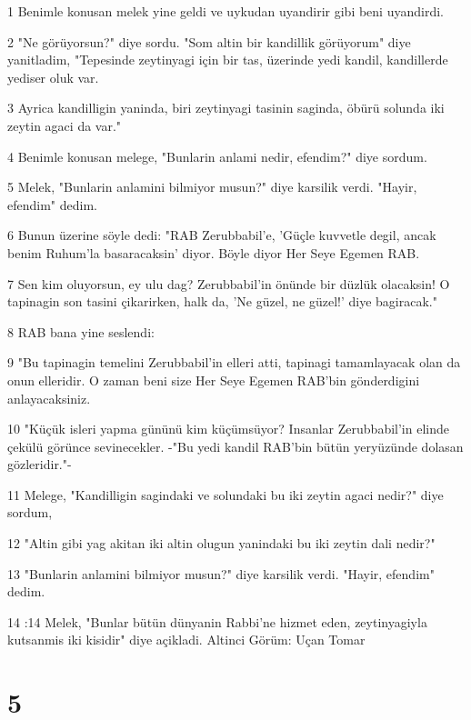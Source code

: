 \par 1 Benimle konusan melek yine geldi ve uykudan uyandirir gibi beni uyandirdi.
\par 2 "Ne görüyorsun?" diye sordu. "Som altin bir kandillik görüyorum" diye yanitladim, "Tepesinde zeytinyagi için bir tas, üzerinde yedi kandil, kandillerde yediser oluk var.
\par 3 Ayrica kandilligin yaninda, biri zeytinyagi tasinin saginda, öbürü solunda iki zeytin agaci da var."
\par 4 Benimle konusan melege, "Bunlarin anlami nedir, efendim?" diye sordum.
\par 5 Melek, "Bunlarin anlamini bilmiyor musun?" diye karsilik verdi. "Hayir, efendim" dedim.
\par 6 Bunun üzerine söyle dedi: "RAB Zerubbabil'e, 'Güçle kuvvetle degil, ancak benim Ruhum'la basaracaksin' diyor. Böyle diyor Her Seye Egemen RAB.
\par 7 Sen kim oluyorsun, ey ulu dag? Zerubbabil'in önünde bir düzlük olacaksin! O tapinagin son tasini çikarirken, halk da, 'Ne güzel, ne güzel!' diye bagiracak."
\par 8 RAB bana yine seslendi:
\par 9 "Bu tapinagin temelini Zerubbabil'in elleri atti, tapinagi tamamlayacak olan da onun elleridir. O zaman beni size Her Seye Egemen RAB'bin gönderdigini anlayacaksiniz.
\par 10 "Küçük isleri yapma gününü kim küçümsüyor? Insanlar Zerubbabil'in elinde çekülü görünce sevinecekler. -"Bu yedi kandil RAB'bin bütün yeryüzünde dolasan gözleridir."-
\par 11 Melege, "Kandilligin sagindaki ve solundaki bu iki zeytin agaci nedir?" diye sordum,
\par 12 "Altin gibi yag akitan iki altin olugun yanindaki bu iki zeytin dali nedir?"
\par 13 "Bunlarin anlamini bilmiyor musun?" diye karsilik verdi. "Hayir, efendim" dedim.
\par 14 :14 Melek, "Bunlar bütün dünyanin Rabbi'ne hizmet eden, zeytinyagiyla kutsanmis iki kisidir" diye açikladi. Altinci Görüm: Uçan Tomar

\chapter{5}

